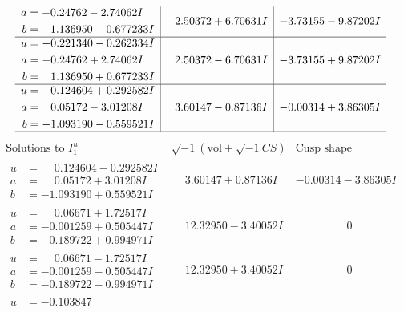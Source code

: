 \documentclass[1p]{elsarticle_modified}
\theoremstyle{definition}
\newcommand{\I}{\sqrt{-1}}
\begin{document}
$$\begin{array}{c|c|c}
\begin{aligned}
a &= -0.24762 - 2.74062 I \\
b &= \phantom{-}1.136950 - 0.677233 I\end{aligned}
 & \phantom{-}2.50372 + 6.70631 I & -3.73155 - 9.87202 I \\ \hline\begin{aligned}
u &= -0.221340 - 0.262334 I \\
a &= -0.24762 + 2.74062 I \\
b &= \phantom{-}1.136950 + 0.677233 I\end{aligned}
 & \phantom{-}2.50372 - 6.70631 I & -3.73155 + 9.87202 I \\ \hline\begin{aligned}
u &= \phantom{-}0.124604 + 0.292582 I \\
a &= \phantom{-}0.05172 - 3.01208 I \\
b &= -1.093190 - 0.559521 I\end{aligned}
 & \phantom{-}3.60147 - 0.87136 I & -0.00314 + 3.86305 I\\
 \hline 
 \end{array}$$\newpage$$\begin{array}{c|c|c}  
\text{Solutions to }I^u_{1}& \I (\text{vol} + \sqrt{-1}CS) & \text{Cusp shape}\\
 \hline 
\begin{aligned}
u &= \phantom{-}0.124604 - 0.292582 I \\
a &= \phantom{-}0.05172 + 3.01208 I \\
b &= -1.093190 + 0.559521 I\end{aligned}
 & \phantom{-}3.60147 + 0.87136 I & -0.00314 - 3.86305 I \\ \hline\begin{aligned}
u &= \phantom{-}0.06671 + 1.72517 I \\
a &= -0.001259 + 0.505447 I \\
b &= -0.189722 + 0.994971 I\end{aligned}
 & \phantom{-}12.32950 - 3.40052 I & \phantom{-0.000000 } 0 \\ \hline\begin{aligned}
u &= \phantom{-}0.06671 - 1.72517 I \\
a &= -0.001259 - 0.505447 I \\
b &= -0.189722 - 0.994971 I\end{aligned}
 & \phantom{-}12.32950 + 3.40052 I & \phantom{-0.000000 } 0 \\ \hline\begin{aligned}
u &= -0.103847\phantom{ +0.000000I} \\

\end{aligned}
\end{array}$$
\end{document}
